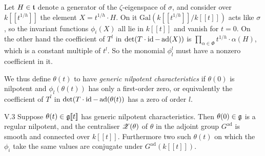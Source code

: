 \documentclass[12pt,english]{smfart}
\theoremstyle{plain} \newtheorem{innerthm}{Theorem} \newtheorem{innerlem}{Lemma} \newtheorem{innerprop}{Proposition} \newtheorem{innercor}{Corollary} \theoremstyle{definition} \newtheorem{innerdefn}{Definition} \newtheorem{innerconstr}{Construction} \theoremstyle{remark} \newtheorem*{remark}{Remark} \newtheorem*{remarks}{Remarks} \newtheorem*{applications}{Applications}
\begin{document}
Let $H\in\mathfrak{t}$ denote a generator of the $\zeta$-eigenspace of $\sigma$, and consider over $k[\![t^{1/h}]\!]$ the element $X=t^{1/h}\cdot H$. On it $\mathrm{Gal}(k[\![t^{1/h}]\!]/k[\![t]\!])$ acts like $\sigma$, so the invariant functions $\phi_i(X)$ all lie in $k[\![t]\!]$ and vanish for $t=0$. On the other hand the coefficient of $T^l$ in $\det(T\cdot\operatorname{id}-\operatorname{ad}(X))$ is $\prod_{\alpha\in\Phi}t^{1/h}\cdot\alpha(H)$, which is a constant multiple of $t^l$. So the monomial $\phi_l^l$ must have a nonzero coefficient in it.

We thus define $\theta(t)$ to have \textit{generic nilpotent characteristics} if $\theta(0)$ is nilpotent and $\phi_l(\theta(t))$ has only a first-order zero, or equivalently the coefficient of $T^l$ in $\det(T\cdot\operatorname{id}-\operatorname{ad}(\theta(t))$ has a zero of order $l$.

\begin{proposition}{V.3}\label{prop:V.3}
Suppose $\theta(t)\in\mathfrak{g}[\![t]\!]$ has generic nilpotent characteristics. Then $\theta(0)\in\mathfrak{g}$ is a regular nilpotent, and the centraliser $\mathscr{Z}(\theta)$ of $\theta$ in the adjoint group $G^{\mathrm{ad}}$ is smooth and connected over $k[\![t]\!]$. Furthermore two such $\theta(t)$ on which the $\phi_i$ take the same values are conjugate under $G^{\mathrm{ad}}(k[\![t]\!])$.
\end{proposition}
\end{document}
